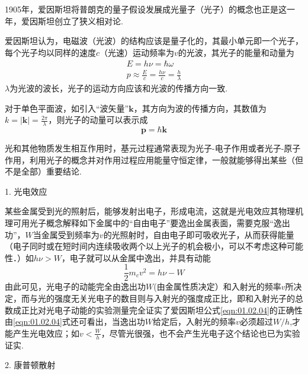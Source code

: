 \section[光子]{}\label{sec:01.02}

1905年，爱因斯坦将普朗克的量子假设发展成光量子（光子）的概念也正是这一年，爱因斯坦创立了狭义相对论.

爱因斯坦认为，电磁波（光波）的结构应该是量子化的，其最小单元即一个光子，每个光子均以同样的速度$c$（光速）运动频率为$v$的光波，其光子的能量和动量为
\begin{align}
	E=h\nu=\hbar\omega \label{eqn:01.02.01} \\ 
	p\approx \frac{E}{c}=\frac{h\nu}{c}=\frac{h}{\lambda} \label{eqn:01.02.02}
\end{align}
$\lambda$为光波的波长，光子的运动方向应该和光波的传播方向一致.

对于单色平面波，如引入“波矢量”$\boldsymbol{k}$，其方向为波的传播方向，其数值为$k=| \boldsymbol{k}|=\frac{2\pi}{\lambda}$，则光子的动量可以表示成
\begin{equation}\label{eqn:01.02.03}
	\boldsymbol{p}=\hbar \boldsymbol{k}
\end{equation}\eqnormal

光和其他物质发生相互作用时，基元过程通常表现为光子-电子作用或者光子-原子作用，利用光子的概念并对作用过程应用能量守恒定律，一般就能够得出某些（但不是全部）重要结论.

\textsf{1. 光电效应}

某些金属受到光的照射后，能够发射出电子，形成电流，这就是光电效应其物理机理可用光子概念解释如下金属中的“自由电子”要逸出金属表面，需要克服“逸出功”，$W$当金属受到频率为$v$的光照射时，自由电子即可吸收光子，从而获得能量（电子同时或在短时间内连续吸收两个以上光子的机会极小，可以不考虑这种可能性．）如$h\nu>W$，电子就可以从金属中逸出，并具有动能
\begin{equation}\label{eqn:01.02.04}
	\boxed{\frac{1}{2}m_{c}v^{2}=h\nu-W}
\end{equation}
由此可见，光电子的动能完全由逸出功$W$(由金属性质决定）和入射光的频率$v$所决定，而与光的强度无关光电子的数目则与入射光的强度成正比，即和入射光子的总数成正比对光电子动能的实验测量完全证实了爱因斯坦公式\eqref{eqn:01.02.04}的正确性由\eqref{eqn:01.02.04}式还可看出，当逸出功$W$给定后，入射光的频率$v$必须超过$W/h$,才能产生光电效应；如$v<\frac{W}{h}$，尽管光很强，也不会产生光电子这个结论也已为实验证实.

\textsf{2. 康普顿散射}

